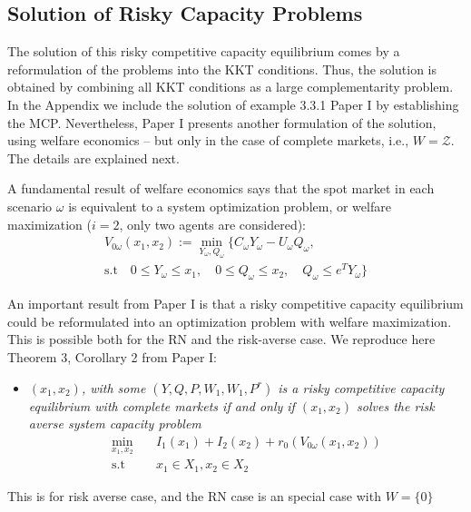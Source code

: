 \documentclass[11pt, letterpaper]{article}
\begin{document}
\subsection{Solution of Risky Capacity Problems}

The solution of this risky competitive capacity equilibrium comes by a reformulation of the problems into the KKT conditions. Thus, the solution is obtained by combining all KKT conditions as a large complementarity problem. In the Appendix we include the solution of example 3.3.1 Paper I by establishing the MCP. Nevertheless, Paper I presents another formulation of the solution, using welfare economics -- but only in the case of complete markets, i.e., $ W=\mathcal{Z}$. The details are explained next. 

A fundamental result of welfare economics says that the spot market in each scenario $\omega$ is equivalent to a system optimization problem, or welfare maximization ($i=2$, only two agents are considered):
\begin{multline}
    V_{0\omega}(x_1,x_2) := \min_{Y_\omega, Q_\omega} \{ C_\omega Y_\omega - U_\omega Q_\omega, \\ 
    \textrm{s.t} \quad  0 \leq Y_\omega \leq x_1, \quad 0 \leq Q_\omega \leq x_2, \quad Q_\omega \leq e^T Y_\omega \}
\end{multline}

An important result from Paper I is that a risky competitive capacity equilibrium  could be reformulated into an optimization problem with welfare maximization. This is possible both for the RN and the risk-averse case. We reproduce here Theorem 3, Corollary 2 from Paper I:
\begin{flushleft}
\begin{itemize}
    \item \textit{$(x_1,x_2)$, with some $(Y,Q,P,W_1,W_1,P^r)$ is a risky competitive capacity equilibrium with complete markets if and only if $(x_1,x_2)$ solves the risk averse system capacity problem}
    \begin{align}
        \min_{x_1,x_2} & \quad I_1(x_1) + I_2(x_2) + r_0(V_{0\omega}(x_1,x_2))\\
        \textrm{s.t} & \quad x_1 \in X_1, x_2 \in X_2
    \end{align}
\end{itemize}

\end{flushleft}

This is for risk averse case, and the RN case is an special case with $W=\{0 \}$
\end{document}
